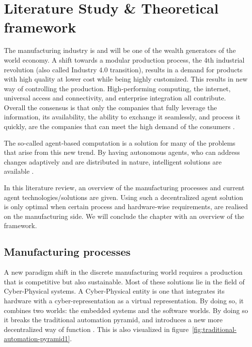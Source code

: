 \chapter{Literature Study \& Theoretical framework}
\label{ch:literature}
The manufacturing industry is and will be one of the wealth generators of the world economy. A shift towards a modular production process, the 4th industrial revolution (also called Industry 4.0 transition), results in a demand for products with high quality at lower cost while being highly customized. This results in new way of controlling the production. High-performing computing, the internet, universal access and connectivity, and enterprise integration all contribute. Overall the consensus is that only the companies that fully leverage the information, its availability, the ability to exchange it seamlessly, and process it quickly, are the companies that can meet the high demand of the consumers \citep{monostori2006agent}. 

The so-called agent-based computation is a solution for many of the problems that arise from this new trend. By having autonomous agents, who can address changes adaptively and are distributed in nature, intelligent solutions are available \citep{monostori2006agent}.

In this literature review, an overview of the manufacturing processes and current agent technologies/solutions are given. Using such a decentralized agent solution is only optimal when certain process and hardware-wise requirements, are realised on the manufacturing side. We will conclude the chapter with an overview of the framework.
\cite{abedin2014agenda}


\section{Manufacturing processes}
	
	A new paradigm shift in the discrete manufacturing world requires a production that is competitive but also sustainable. Most of these solutions lie in the field of Cyber-Physical systems. A Cyber-Physical entity is one that integrates its hardware with a cyber-representation as a virtual representation. By doing so, it combines two worlds: the embedded systems and the software worlds. By doing so it breaks the traditional automation pyramid, and introduces a new more decentralized way of function \citep{leitao2016smart}. This is also visualized in figure~\ref{fig:traditional-automation-pyramid1}. %
	
